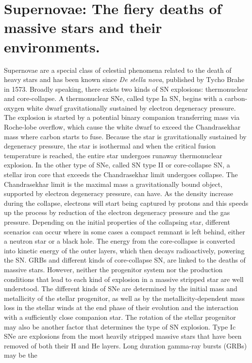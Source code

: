 \section{Supernovae: The fiery deaths of massive stars and their environments.}
\label{sec:intro:sn}
Supernovae are a special class of celestial phenomena related to the death of
heavy stars and has been known since \textit{De stella nova}, published by Tycho Brahe in 1573.
Broadly speaking,
there exists two kinds of SN explosions: thermonuclear and
core-collapse. A
thermonuclear SNe, called type Ia SN, begins with a
carbon-oxygen white dwarf
 gravitationally sustained by electron degeneracy
pressure. The explosion is
started by a potential binary companion transferring
mass via Roche-lobe
overflow, which cause the white dwarf to exceed the
Chandrasekhar mass where
carbon starts to fuse. Because the star is
gravitationally sustained by
degeneracy pressure, the star is isothermal and
when the critical fusion
temperature is reached, the entire star undergoes
runaway thermonuclear
explosion. In the other type of SNe, called SN type II or
core-collapse SN, a
stellar iron core that exceeds the Chandrasekhar limit
undergoes collapse. The Chandrasekhar limit is the maximal mass a
gravitationally bound object, supported by electron degeneracy pressure, can
have. As the density increase during the collapse, electrons will start
being
captured by protons and this speeds up the process by reduction of the
electron degeneracy pressure and the gas pressure. Depending on the initial
properties
of the collapsing star, different scenarios can occur where in some
cases a
compact remnant is left behind, either a neutron star or a black hole.
The
energy from the core-collapse is converted into kinetic energy of the outer
layers, which then decays radioactively, powering the SN.
GRBs and different
kinds of core-collapse SN, are linked to the
deaths of massive stars. However,
neither the progenitor system nor
  the production conditions that lead to each
kind of explosion in a
  massive stripped star are well understood. The
different kinds of
  SNe are determined by the initial mass and metallicity
of
the stellar progenitor, as well as by the metallicity-dependent
mass loss in the
stellar winds at the end phase of their evolution
and the interaction with a
sufficiently close companion star. The rotation of the stellar progenitor may
also be another factor that determines the type of SN explosion. Type Ic SNe are
explosions from the most heavily stripped
  massive stars that have been removed
of both their H and He layers. Long duration gamma-ray bursts (GRBs) may be the
